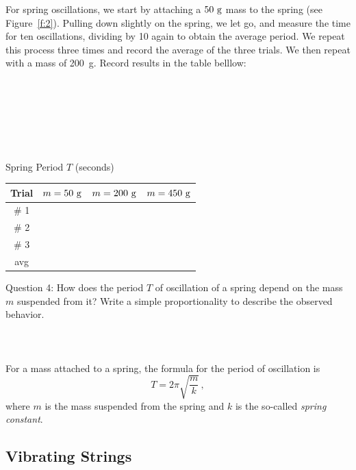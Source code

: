 \documentclass[11pt]{NSF}
\def\be{\begin{equation}}
\def\ee{\end{equation}}
\begin{document}
For spring oscillations, we start by attaching a 
$50~{\rm g}$ mass to the spring (see Figure~\ref{f:2}).
Pulling down slightly on the spring, we let go, and measure the time for ten 
oscillations, dividing by 10 again to obtain the average period.
We repeat this process three times and record the average of the three trials.
We then repeat with a mass of 200~g.
Record results in the table belllow:
\\
\\
\\
\\
\\
\\
\\
%
\begin{table}[!ht]
\begin{center}
Spring Period $T$ (seconds)\\
\begin{tabular}{| c | c | c | c | }
\hline
Trial & $m=50~{\rm g}$ & $m=200~{\rm g}$ & $m=450~{\rm g}$\\
\hline
\# 1 &  &  & \\
\hline
\# 2 &  &  & \\
\hline
\# 3 &  &  & \\
\hline
avg  &  &  & \\
\hline
\end{tabular}
\label{t:2}
\end{center}
\end{table}
%

Question 4: \hspace{.5cm} How does the period $T$ of oscillation of a spring depend 
on the mass $m$ suspended from it? 
Write a simple proportionality to describe the observed behavior.
\\
\\
\\
\\

For a mass attached to a spring, the formula for the period of 
oscillation is
\be
T=2\pi\sqrt{\frac{m}{k}}\,,
\ee
where $m$ is the mass suspended from the spring and $k$ is the so-called
{\em spring constant}.

\subsection{Vibrating Strings}
\end{document}
